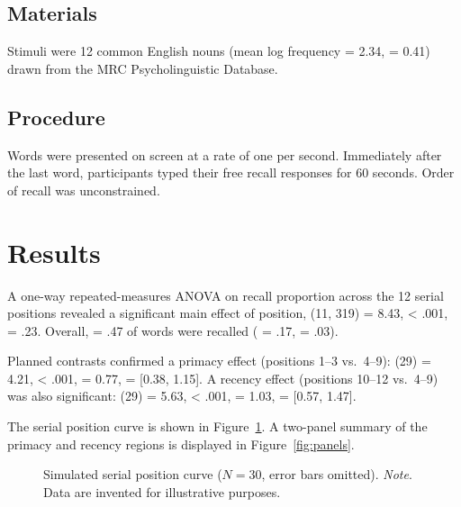 \documentclass[man,floatsintext]{apa6}   %
\begin{document}
\subsection{Materials}

Stimuli were 12 common English nouns (mean log frequency = 2.34,
\SD{} = 0.41) drawn from the MRC Psycholinguistic Database.

\subsection{Procedure}

Words were presented on screen at a rate of one per second. Immediately
after the last word, participants typed their free recall responses for
60 seconds. Order of recall was unconstrained.

\section{Results}

A one-way repeated-measures ANOVA on recall proportion across the 12 serial
positions revealed a significant main effect of position,
\F{}(11, 319) = 8.43, \p{} < .001, \etp{} = .23.
Overall, \M{} = .47 of words were recalled (\SD{} = .17, \SE{} = .03).

Planned contrasts confirmed a primacy effect (positions 1--3 vs.\ 4--9):
\T{}(29) = 4.21, \p{} < .001, \D{} = 0.77, \CI{} = [0.38, 1.15].
A recency effect (positions 10--12 vs.\ 4--9) was also significant:
\T{}(29) = 5.63, \p{} < .001, \D{} = 1.03, \CI{} = [0.57, 1.47].

The serial position curve is shown in Figure~\ref{fig:spe}. A two-panel
summary of the primacy and recency regions is displayed in
Figure~\ref{fig:panels}.

\begin{figure}[htbp]
  \centering
  \caption{Simulated serial position curve ($N = 30$, error bars omitted).
    \textit{Note}. Data are invented for illustrative purposes.}
  \label{fig:spe}
\end{figure}
\end{document}
